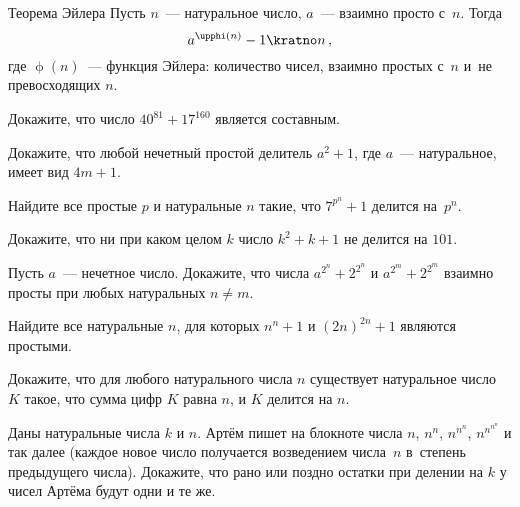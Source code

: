 


\begingroup
    \ifdefined\mupphi
        \def\eulerphi{\mathup{\mupphi}}%
    \fi \ifdefined\upphi
        \def\eulerphi{\upphi}%
    \fi
    \providecommand\eulerphi{\phi}%

\begin{claim}{Теорема Эйлера}
Пусть $n$~--- натуральное число, $a$~--- взаимно просто с~$n$.
Тогда
\[
    a^{\eulerphi(n)} - 1 \kratno n
\, , \]
где $\eulerphi(n)$~--- функция Эйлера: количество чисел, взаимно простых с~$n$
и~не превосходящих $n$.
\end{claim}

\begin{problems}

\item
Докажите, что число $40^{81} + 17^{160}$ является составным.

\item
Докажите, что любой нечетный простой делитель $a^2 + 1$, где $a$~---
натуральное, имеет вид $4 m + 1$.

\item
Найдите все простые $p$ и натуральные $n$ такие, что $7^{p^{n}} + 1$ делится
на~$p^{n}$.

\item
Докажите, что ни при каком целом $k$ число $k^2 + k + 1$ не делится на $101$.

\item
Пусть $a$~--- нечетное число.
Докажите, что числа $a^{2^{n}} + 2^{2^{n}}$ и $a^{2^{m}} + 2^{2^{m}}$ взаимно
просты при любых натуральных $n \neq m$.

\item
Найдите все натуральные $n$, для которых $n^{n} + 1$ и $(2n)^{2n} + 1$ являются
простыми.

\item
Докажите, что для любого натурального числа $n$ существует натуральное
число~$K$ такое, что сумма цифр $K$ равна $n$, и $K$ делится на $n$.

\item
Даны натуральные числа $k$ и $n$.
Артём пишет на блокноте числа $n$, $n^{n}$, $n^{n^{n}}$, $n^{n^{n^{n}}}$
и так далее (каждое новое число получается возведением числа~$n$ в~степень
предыдущего числа).
Докажите, что рано или поздно остатки при делении на $k$ у чисел Артёма будут
одни и те же.


\end{problems}

\endgroup %

